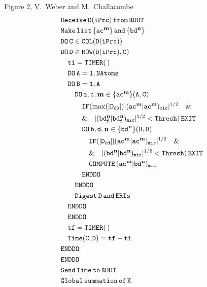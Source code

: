 \documentclass[prl,preprint,doublespace]{revtex4} %
\begin{document}
{\clearpage

\begin{center}
Figure 2, V.~Weber  and M.~Challacombe \\[1.cm]
  \begin{equation*}
    \begin{split}
      &\tt        Receive\,D(iPrc)\,from\,ROOT\\
      &\tt        Make\,list\,\{ac^\mathbf{m}\}\,and\,\{bd^\mathbf{n}\} \\
      &\tt        DO\,C\in COL(D(iPrc)) \\
      &\tt        DO\,D\in ROW(D(iPrc),C) \\
      &\tt\quad     ti=TIMER(\,) \\
      &\tt\quad     DO\,A=1,NAtoms \\
      &\tt\quad     DO\,B=1,A \\
      &\tt\qquad      DO\,a,c,\mathbf{m}\in\{ac^\mathbf{m}\}(A,C) \\
      &\tt\qquad\quad   IF(\max(|D_{cD}|)|(ac^\mathbf{m}|ac^\mathbf{m})_{mic}|^{1/2}\quad\&\\
      &\tt\qquad\quad    \&\quad|(bd_f^\mathbf{n}|bd_f^\mathbf{n})_{mic}|^{1/2}<Thresh)\,EXIT  \\
      &\tt\qquad\quad   DO\,b,d,\mathbf{n}\in\{bd^\mathbf{n}\}(B,D) \\
      &\tt\qquad\qquad    IF(|D_{cd}||(ac^\mathbf{m}|ac^\mathbf{m})_{mic}|^{1/2}\quad\&\\
      &\tt\qquad\qquad    \&\quad|(bd^\mathbf{n}|bd^\mathbf{n})_{mic}|^{1/2}<Thresh)\,EXIT  \\
      &\tt\qquad\qquad    COMPUTE\,(ac^\mathbf{m}|bd^\mathbf{n})_{mic} \\
      &\tt\qquad\quad   ENDDO \\
      &\tt\qquad      ENDDO \\
      &\tt\qquad      Digest\,D\,and\,ERIs \\
      &\tt\quad     ENDDO \\
      &\tt\quad     ENDDO \\
      &\tt\quad     tf=TIMER(\,) \\
      &\tt\quad     Time(C,D)=tf-ti \\
      &\tt        ENDDO \\
      &\tt        ENDDO \\
      &\tt        Send\,Time\,to\,ROOT \\
      &\tt        Global\,summation\,of\,K
    \end{split}
  \end{equation*}
\end{center}

}
\end{document}

